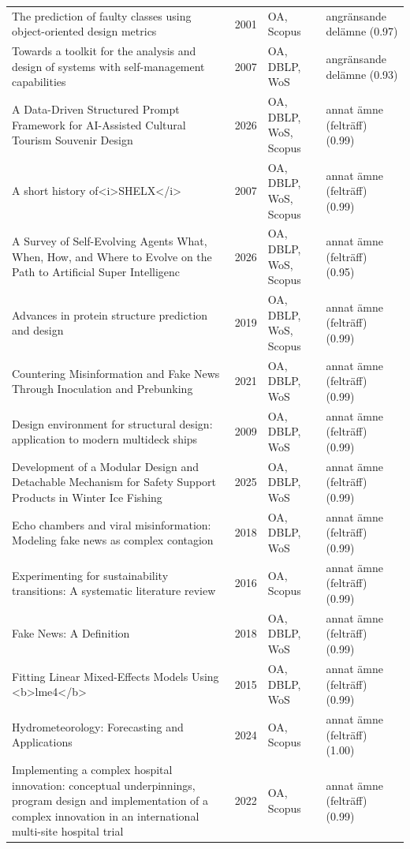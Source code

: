 \begin{longtable}{@{}%
  >{\raggedright\arraybackslash}p{}c%
  >{\raggedright\arraybackslash}p{}%
  >{\raggedright\arraybackslash}p{}@{}}
The prediction of faulty classes using object-oriented design metrics & 2001 & OA, Scopus & angränsande delämne (0.97) \\
Towards a toolkit for the analysis and design of systems with self-management capabilities & 2007 & OA, DBLP, WoS & angränsande delämne (0.93) \\
A Data-Driven Structured Prompt Framework for AI-Assisted Cultural Tourism Souvenir Design & 2026 & OA, DBLP, WoS, Scopus & annat ämne (felträff) (0.99) \\
A short history of<i>SHELX</i> & 2007 & OA, DBLP, WoS, Scopus & annat ämne (felträff) (0.99) \\
A Survey of Self-Evolving Agents What, When, How, and Where to Evolve on the Path to Artificial Super Intelligenc & 2026 & OA, DBLP, WoS, Scopus & annat ämne (felträff) (0.95) \\
Advances in protein structure prediction and design & 2019 & OA, DBLP, WoS, Scopus & annat ämne (felträff) (0.99) \\
Countering Misinformation and Fake News Through Inoculation and Prebunking & 2021 & OA, DBLP, WoS & annat ämne (felträff) (0.99) \\
Design environment for structural design: application to modern multideck ships & 2009 & OA, DBLP, WoS & annat ämne (felträff) (0.99) \\
Development of a Modular Design and Detachable Mechanism for Safety Support Products in Winter Ice Fishing & 2025 & OA, DBLP, WoS & annat ämne (felträff) (0.99) \\
Echo chambers and viral misinformation: Modeling fake news as complex contagion & 2018 & OA, DBLP, WoS & annat ämne (felträff) (0.99) \\
Experimenting for sustainability transitions: A systematic literature review & 2016 & OA, Scopus & annat ämne (felträff) (0.99) \\
Fake News: A Definition & 2018 & OA, DBLP, WoS & annat ämne (felträff) (0.99) \\
Fitting Linear Mixed-Effects Models Using <b>lme4</b> & 2015 & OA, DBLP, WoS & annat ämne (felträff) (0.99) \\
Hydrometeorology: Forecasting and Applications & 2024 & OA, Scopus & annat ämne (felträff) (1.00) \\
Implementing a complex hospital innovation: conceptual underpinnings, program design and implementation of a complex innovation in an international multi-site hospital trial & 2022 & OA, Scopus & annat ämne (felträff) (0.99) \\

\end{longtable}
